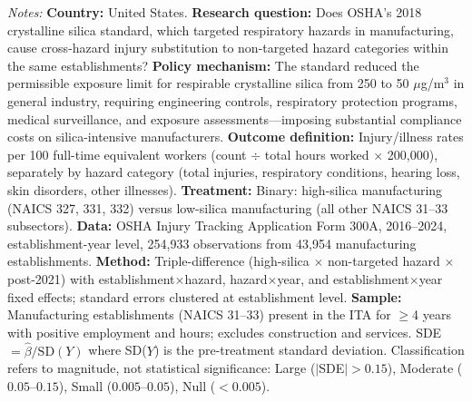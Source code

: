 \begin{table}[t]
\begin{tablenotes}
\item \textit{Notes:} \textbf{Country:} United States. \textbf{Research question:} Does OSHA's 2018 crystalline silica standard, which targeted respiratory hazards in manufacturing, cause cross-hazard injury substitution to non-targeted hazard categories within the same establishments? \textbf{Policy mechanism:} The standard reduced the permissible exposure limit for respirable crystalline silica from 250 to 50 $\mu$g/m$^3$ in general industry, requiring engineering controls, respiratory protection programs, medical surveillance, and exposure assessments---imposing substantial compliance costs on silica-intensive manufacturers. \textbf{Outcome definition:} Injury/illness rates per 100 full-time equivalent workers (count $\div$ total hours worked $\times$ 200,000), separately by hazard category (total injuries, respiratory conditions, hearing loss, skin disorders, other illnesses). \textbf{Treatment:} Binary: high-silica manufacturing (NAICS 327, 331, 332) versus low-silica manufacturing (all other NAICS 31--33 subsectors). \textbf{Data:} OSHA Injury Tracking Application Form 300A, 2016--2024, establishment-year level, 254,933 observations from 43,954 manufacturing establishments. \textbf{Method:} Triple-difference (high-silica $\times$ non-targeted hazard $\times$ post-2021) with establishment$\times$hazard, hazard$\times$year, and establishment$\times$year fixed effects; standard errors clustered at establishment level. \textbf{Sample:} Manufacturing establishments (NAICS 31--33) present in the ITA for $\geq$4 years with positive employment and hours; excludes construction and services. SDE $= \hat{\beta} / \text{SD}(Y)$ where SD($Y$) is the pre-treatment standard deviation. Classification refers to magnitude, not statistical significance: Large ($|$SDE$| > 0.15$), Moderate ($0.05$--$0.15$), Small ($0.005$--$0.05$), Null ($< 0.005$).
\end{tablenotes}
\end{table}
